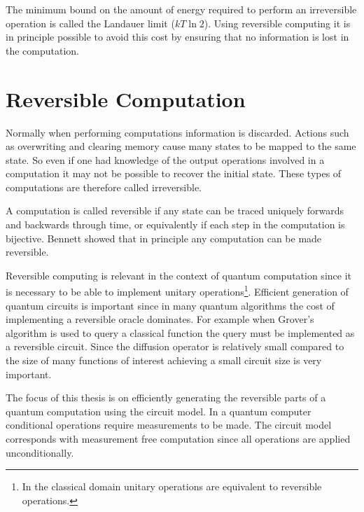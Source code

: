 The minimum bound on the amount of energy required to perform an irreversible
operation is called the Landauer limit ($kT\ln 2$). Using reversible computing
it is in principle possible to avoid this cost by ensuring that no information
is lost in the computation.


\section{Reversible Computation}

Normally when performing computations information is discarded. Actions such as
overwriting and clearing memory cause many states to be mapped to the same
state. So even if one had knowledge of the output operations involved in a computation it
may not be possible to recover the initial state. These types of computations
are therefore called irreversible.

A computation is called reversible if any state can be traced uniquely forwards
and backwards through time, or equivalently if each step in the computation is
bijective. Bennett\cite{Bennett:73} showed that in principle any computation
can be made reversible.

Reversible computing is relevant in the context of quantum computation since it
is necessary to be able to implement unitary operations\footnote{In the
classical domain unitary operations are equivalent to reversible operations.}.
Efficient generation of quantum circuits is important since in many quantum
algorithms the cost of implementing a reversible oracle dominates. For example
when Grover's algorithm is used to query a classical function the query must be
implemented as a reversible circuit. Since the diffusion operator is relatively
small compared to the size of many functions of interest\cite{gbm2016,sha2016}
achieving a small circuit size is very important.

The focus of this thesis is on efficiently generating the reversible parts of a
quantum computation using the circuit model. In a quantum computer conditional
operations require measurements to be made. The circuit model corresponds with
measurement free computation since all operations are applied unconditionally.

